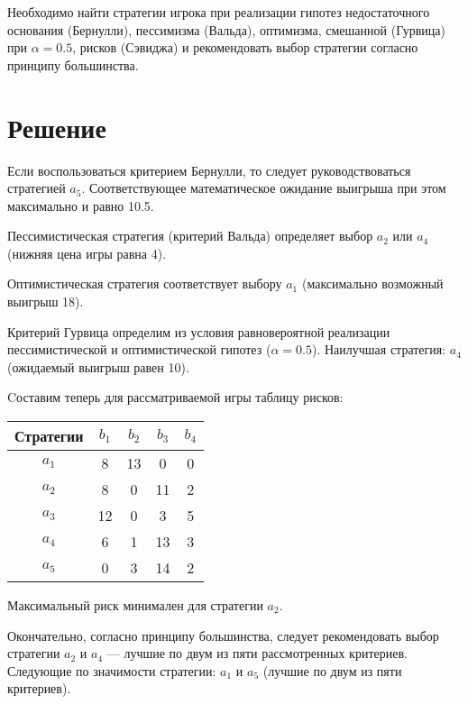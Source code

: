 \documentclass[12pt,a4paper,oneside]{extarticle}
\begin{document}
    Необходимо найти стратегии игрока при реализации гипотез недостаточного основания (Бернулли), пессимизма (Вальда), оптимизма, смешанной (Гурвица) при $\alpha=0.5$, рисков (Сэвиджа) и рекомендовать выбор стратегии согласно принципу большинства.

\section{Решение}
    Если воспользоваться критерием Бернулли, то следует руководствоваться стратегией $a_5$. Соответствующее математическое ожидание выигрыша при этом максимально и равно 10.5.

    Пессимистическая стратегия (критерий Вальда) определяет выбор $a_2$ или $a_4$ (нижняя цена игры равна 4).

    Оптимистическая стратегия соответствует выбору $a_1$ (максимально возможный выигрыш 18).

    Критерий Гурвица определим из условия равновероятной реализации пессимистической и оптимистической гипотез ($\alpha = 0.5$). Наилучшая стратегия: $a_4$ (ожидаемый выигрыш равен 10).

    Cоставим теперь для рассматриваемой игры таблицу рисков:
    \begin{center}
        \begin{tabular}{|c|c|c|c|c|}
            \hline
            Стратегии & $b_1$ & $b_2$ & $b_3$ & $b_4$ \\ \hline
            $a_1$     & 8     & 13     & 0    & 0     \\ \hline 
            $a_2$     & 8     & 0      & 11   & 2     \\ \hline 
            $a_3$     & 12    & 0      & 3    & 5     \\ \hline 
            $a_4$     & 6     & 1      & 13   & 3     \\ \hline 
            $a_5$     & 0     & 3      & 14   & 2     \\ \hline 
        \end{tabular}
    \end{center}

    Максимальный риск минимален для стратегии $a_2$.

    Окончательно, согласно принципу большинства, следует рекомендовать выбор стратегии $a_2$ и $a_4$ --- лучшие по двум из пяти рассмотренных критериев. Следующие по значимости стратегии: $a_1$ и $a_5$ (лучшие по двум из пяти критериев).
\end{document}
